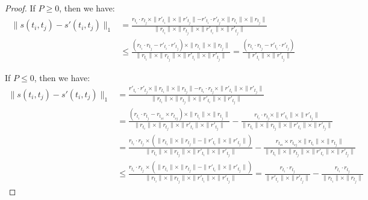 \documentclass[11pt]{article}
\theoremstyle{plain}
\theoremstyle{definition}
\begin{document}
\begin{proof}
If $P \geq 0$, then we have:
\begin{align*}
\parallel s(t_i, t_j) - s'(t_i, t_j) \parallel_1 &=\frac{r_{t_i} \cdot r_{t_j} \times \parallel r'_{t_i} \parallel \times \parallel r'_{t_j} \parallel -
r'_{t_i} \cdot r'_{t_j} \times \parallel r_{t_i} \parallel \times \parallel r_{t_j} \parallel 
}{\parallel r_{t_i} \parallel \times \parallel r_{t_j} \parallel \times \parallel r'_{t_i} \parallel \times \parallel r'_{t_j} \parallel} \\
& \leq \frac{(r_{t_i} \cdot r_{t_j} - r'_{t_i} \cdot r'_{t_j}) \times \parallel r_{t_i} \parallel \times \parallel r_{t_j} \parallel}
{\parallel r_{t_i} \parallel \times \parallel r_{t_j} \parallel \times \parallel r'_{t_i} \parallel \times \parallel r'_{t_j} \parallel} = \frac{(r_{t_i} \cdot r_{t_j} - r'_{t_i} \cdot r'_{t_j})}
{\parallel r'_{t_i} \parallel \times \parallel r'_{t_j} \parallel}&
\end{align*}

If $P \leq 0$, then we have:
\begin{align*}
 \parallel s(t_i, t_j) - s'(t_i, t_j) \parallel_1 &=
\frac{r'_{t_i} \cdot r'_{t_j} \times \parallel r_{t_i} \parallel \times \parallel r_{t_j} \parallel - r_{t_i} \cdot r_{t_j} \times \parallel r'_{t_i} \parallel \times \parallel r'_{t_j} \parallel }
{\parallel r_{t_i} \parallel \times \parallel r_{t_j} \parallel \times \parallel r'_{t_i} \parallel \times \parallel r'_{t_j} \parallel} \\
& = \frac{(r_{t_i} \cdot r_{t_j} - r_{t_{xi}} \times r_{t_{xj}}) \times \parallel r_{t_i} \parallel \times \parallel r_{t_j} \parallel}
{\parallel r_{t_i} \parallel \times \parallel r_{t_j} \parallel \times \parallel r'_{t_i} \parallel \times \parallel r'_{t_j} \parallel}  - \frac{r_{t_i} \cdot r_{t_j} \times \parallel r'_{t_i} \parallel \times \parallel r'_{t_j} \parallel}{\parallel r_{t_i} \parallel \times \parallel r_{t_j} \parallel \times \parallel r'_{t_i} \parallel \times \parallel r'_{t_j} \parallel} \\
&= \frac{r_{t_i} \cdot r_{t_j} \times (\parallel r_{t_i} \parallel \times \parallel r_{t_j} \parallel  - \parallel r'_{t_i} \parallel \times \parallel r'_{t_j} \parallel)}
{\parallel r_{t_i} \parallel \times \parallel r_{t_j} \parallel \times \parallel r'_{t_i} \parallel \times \parallel r'_{t_j} \parallel} - \frac{r_{t_{xi}} \times r_{t_{xj}} \times \parallel r_{t_i} \parallel \times \parallel r_{t_j} \parallel}{\parallel r_{t_i} \parallel \times \parallel r_{t_j} \parallel \times \parallel r'_{t_i} \parallel \times \parallel r'_{t_j} \parallel}\\
& \leq \frac{r_{t_i} \cdot r_{t_j} \times (\parallel r_{t_i} \parallel \times \parallel r_{t_j} \parallel  - \parallel r'_{t_i} \parallel \times \parallel r'_{t_j} \parallel)}
{\parallel r_{t_i} \parallel \times \parallel r_{t_j} \parallel \times \parallel r'_{t_i} \parallel \times \parallel r'_{t_j} \parallel} =\frac{r_{t_i} \cdot r_{t_j}} {\parallel r'_{t_i} \parallel \times \parallel r'_{t_j} \parallel} - \frac{r_{t_i} \cdot r_{t_j}} {\parallel r_{t_i} \parallel \times \parallel r_{t_j} \parallel}&
\end{align*}


\end{proof}
\end{document}

